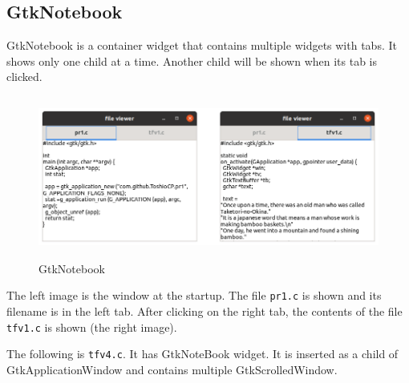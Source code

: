 \subsection{GtkNotebook}\label{gtknotebook}

GtkNotebook is a container widget that contains multiple widgets with
tabs. It shows only one child at a time. Another child will be shown
when its tab is clicked.

\begin{figure}
\centering
\includegraphics[width=13.2cm,height=5.325cm]{../image/screenshot_gtk_notebook.png}
\caption{GtkNotebook}
\end{figure}

The left image is the window at the startup. The file
\passthrough{\lstinline!pr1.c!} is shown and its filename is in the left
tab. After clicking on the right tab, the contents of the file
\passthrough{\lstinline!tfv1.c!} is shown (the right image).

The following is \passthrough{\lstinline!tfv4.c!}. It has GtkNoteBook
widget. It is inserted as a child of GtkApplicationWindow and contains
multiple GtkScrolledWindow.

